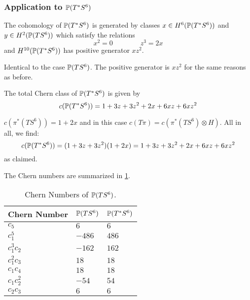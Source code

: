 \documentclass{scrartcl}
\begin{document}
\subsubsection{Application to $\P(T^*S^6)$}

\begin{prop}
	The cohomology of $\P(T^*S^6)$ is generated by classes $x\in H^6(\P(T^*S^6))$ and $y\in H^2(\P(TS^6))$ which satisfy the relations
	\begin{equation*}
		x^2=0 \qquad \qquad z^3=2x
	\end{equation*}
	and $H^{10}(\P(T^*S^6))$ has positive generator $xz^2$.
\end{prop}
\begin{myproof}
	Identical to the case $\P(TS^6)$. The positive generator is $xz^2$ for the same reasons as before.
\end{myproof}

\begin{prop}
	The total Chern class of $\P(T^*S^6)$ is given by
	\begin{equation*}
		c(\P(T^*S^6))=1+3z+3z^2+2x+6xz+6xz^2
	\end{equation*}
\end{prop}
\begin{myproof}
	$c(\pi^*(TS^6))=1+2x$ and in this case $c(T\pi)=c(\pi^*(TS^6)\otimes H)$. All in all, we find:
	\begin{equation*}
		c(\P(T^*S^6))=(1+3z+3z^2)(1+2x)=1+3z+3z^2+2x+6xz+6xz^2
	\end{equation*}
	as claimed.
\end{myproof}

The Chern numbers are summarized in \cref{tab:numbers}.

\begin{table}[ht!]\centering
	\begin{tabular}{lll} \toprule
		Chern Number& $\P(TS^6)$ & $\P(T^*S^6)$ \\ \midrule
		$c_5$ 		& $6$ 	&  $6$\\
		$c_1^5$ 	& $-486$&  $486$\\
		$c_1^3c_2$	& $-162$&  $162$\\
		$c_1^2c_3$	& $18$ 	&  $18$\\
		$c_1c_4$	& $18$ 	&  $18$\\
		$c_1c_2^2$	& $-54$ &  $54$\\
		$c_2c_3$	& $6$	&  $6$\\ \bottomrule
	\end{tabular}
	\caption{Chern Numbers of $\P(TS^6)$.}\label{tab:numbers}
\end{table}
\end{document}
